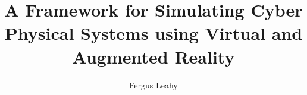 \documentclass[a4paper,12pt,twoside]{report}
\begin{document}
\title{\LARGE {\bf A Framework for Simulating Cyber Physical Systems using Virtual and Augmented Reality}\\
 \vspace*{6mm}
}

\author{Fergus Leahy}

\normallinespacing
\maketitle

\preface





\body











\appendix




\end{document}
